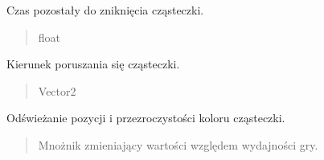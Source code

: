 \documentclass[letterpaper,10pt,polish]{sphinxmanual}
\begin{document}
\begin{fulllineitems}
\begin{fulllineitems}
\begin{quote}
\begin{description}
\end{description}\end{quote}

\end{fulllineitems}


\begin{fulllineitems}
\label{\detokenize{particle:particle.Particle.timer}}
\pysigstartsignatures
{}
\pysigstopsignatures
\sphinxAtStartPar
Czas pozostały do zniknięcia cząsteczki.
\begin{quote}\begin{description}
\sphinxAtStartPar
float

\end{description}\end{quote}

\end{fulllineitems}


\begin{fulllineitems}
\label{\detokenize{particle:particle.Particle.direction}}
\pysigstartsignatures
{}
\pysigstopsignatures
\sphinxAtStartPar
Kierunek poruszania się cząsteczki.
\begin{quote}\begin{description}
\sphinxAtStartPar
Vector2

\end{description}\end{quote}

\end{fulllineitems}


\begin{fulllineitems}
\label{\detokenize{particle:particle.Particle.update}}
\pysigstartsignatures
{}
\pysigstopsignatures
\sphinxAtStartPar
Odświeżanie pozycji i przezroczystości koloru cząsteczki.
\begin{quote}\begin{description}
\sphinxAtStartPar
{} \textendash{} Mnożnik zmieniający wartości względem wydajności gry.

\end{description}\end{quote}

\end{fulllineitems}


\end{fulllineitems}
\end{document}
